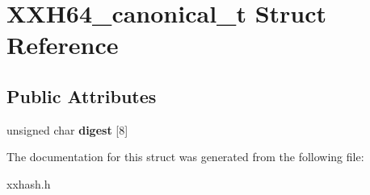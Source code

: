 \hypertarget{structXXH64__canonical__t}{}\section{X\+X\+H64\+\_\+canonical\+\_\+t Struct Reference}
\label{structXXH64__canonical__t}
\subsection*{Public Attributes}
\begin{DoxyCompactItemize}
\item 
\hypertarget{structXXH64__canonical__t_ad62f1c1b20213c45a6686e1e3446c703}{}unsigned char {\bfseries digest} \mbox{[}8\mbox{]}\label{structXXH64__canonical__t_ad62f1c1b20213c45a6686e1e3446c703}

\end{DoxyCompactItemize}


The documentation for this struct was generated from the following file\+:\begin{DoxyCompactItemize}
\item 
xxhash.\+h\end{DoxyCompactItemize}
